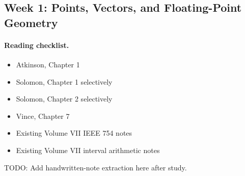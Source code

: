 \subsection{Week 1: Points, Vectors, and Floating-Point Geometry}

\paragraph{Reading checklist.}
\begin{itemize}
  \item Atkinson, Chapter 1
  \item Solomon, Chapter 1 selectively
  \item Solomon, Chapter 2 selectively
  \item Vince, Chapter 7
  \item Existing Volume VII IEEE 754 notes
  \item Existing Volume VII interval arithmetic notes
\end{itemize}

\begin{remark*}
\begingroup\small
{}
\endgroup
\end{remark*}

\begin{remark*}
TODO: Add handwritten-note extraction here after study.
\end{remark*}
